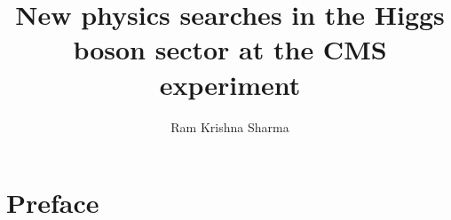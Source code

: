 \documentclass[11pt,a4paper]{postdoc_temp}
\author{Ram Krishna Sharma}
\title{New physics searches in the Higgs boson sector at the CMS experiment}
\begin{document}

\maketitle
\chapter*{Preface}



\tableofcontents
\listoffigures
\listoftables

\cuerpo
\setlength{\parskip}{0.75em}




% 
% 

% 
% 
% 
% 

% 
% 


\appendix


\end{document}
